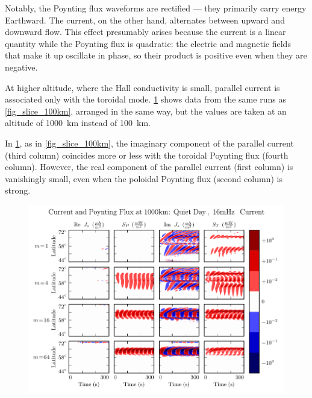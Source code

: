 Notably, the Poynting flux waveforms are rectified --- they primarily carry energy Earthward. The current, on the other hand, alternates between upward and downward flow. This effect presumably arises because the current is a linear quantity while the Poynting flux is quadratic: the electric and magnetic fields that make it up oscillate in phase, so their product is positive even when they are negative. 

At higher altitude, where the Hall conductivity is small, parallel current is associated only with the toroidal mode. \cref{fig_slice_1000km} shows data from the same runs as \cref{fig_slice_100km}, arranged in the same way, but the values are taken at an altitude of \SI{1000}{\km} instead of \SI{100}{\km}. 

In \cref{fig_slice_1000km}, as in \cref{fig_slice_100km}, the imaginary component of the parallel current (third column) coincides more or less with the toroidal Poynting flux (fourth column). However, the real component of the parallel current (first column) is vanishingly small, even when the poloidal Poynting flux (second column) is strong. 

\begin{figure}[!htb]
    \centering
    \includegraphics[width=\textwidth]{figures/slice_1000km.pdf}
    \caption[Current and Poynting Flux at \SI{1000}{\km}]{
      \todo{$\cdots$}
    }
    \label{fig_slice_1000km}
\end{figure}

